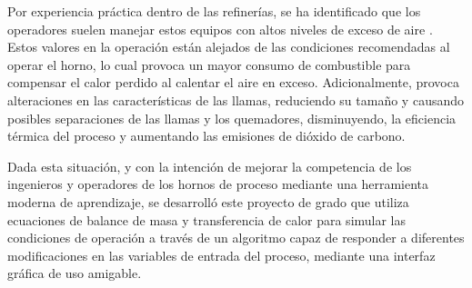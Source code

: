 \par Por experiencia práctica dentro de las refinerías, se ha identificado que los operadores suelen manejar estos equipos con altos niveles de exceso de aire \cite{bib:thermox}. Estos valores en la operación están alejados de las condiciones recomendadas al operar el horno, lo cual provoca un mayor consumo de combustible para compensar el calor perdido al calentar el aire en exceso. Adicionalmente, provoca alteraciones en las características de las llamas, reduciendo su tamaño y causando posibles separaciones de las llamas y los quemadores, disminuyendo, la eficiencia térmica del proceso y aumentando las emisiones de dióxido de carbono.

\par Dada esta situación, y con la intención de mejorar la competencia de los ingenieros y operadores de los hornos de proceso mediante una herramienta moderna de aprendizaje, se desarrolló este proyecto de grado que utiliza ecuaciones de balance de masa y transferencia de calor para simular las condiciones de operación a través de un algoritmo capaz de responder a diferentes modificaciones en las variables de entrada del proceso, mediante una interfaz gráfica de uso amigable.